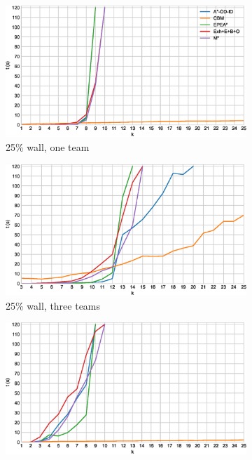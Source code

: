 \documentclass[english]{article}
\newcommand\graphwidth{0.49\textwidth}
\begin{document}
	\begin{figure}[b]
		\centering
		\begin{subfigure}{\graphwidth}
			\centering
			\includegraphics[width=\linewidth]{img/results/relative-comparison/25-1}
			\caption{25\% wall, one team}
			\label{fig:r-25-1}
		\end{subfigure}
		\begin{subfigure}{\graphwidth}
			\centering
			\includegraphics[width=\linewidth]{img/results/relative-comparison/25-3}
			\caption{25\% wall, three teams}
			\label{fig:r-25-3}
		\end{subfigure}
		\begin{subfigure}{\graphwidth}
			\centering
			\includegraphics[width=\linewidth]{img/results/relative-comparison/75-1}

\end{subfigure}
\end{figure}
\end{document}
